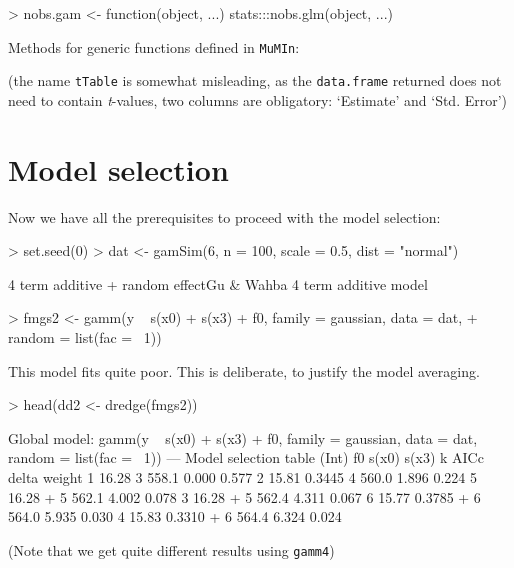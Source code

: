 \documentclass{article}
\newcommand{\code}[1]{{\tt #1}}
\newcommand{\pkg}[1]{{\tt #1}}
\newcommand{\sQuote}[1]{{`#1'}}
\begin{document}
\begin{Schunk}
\begin{Sinput}
> nobs.gam <- function(object, ...) stats:::nobs.glm(object, ...)
\end{Sinput}
\end{Schunk}

Methods for generic functions defined in \pkg{MuMIn}:
\begin{Schunk}
\end{Schunk}
(the name \code{tTable} is somewhat misleading, as the \code{data.frame}
returned does not need to contain \emph{t}-values, two columns are obligatory:
\sQuote{Estimate} and \sQuote{Std. Error})

\section{Model selection}


Now we have all the prerequisites to proceed with the model selection:


\begin{Schunk}
\begin{Sinput}
> set.seed(0)
> dat <- gamSim(6, n = 100, scale = 0.5, dist = "normal")
\end{Sinput}
\begin{Soutput}
4 term additive + random effectGu & Wahba 4 term additive model
\end{Soutput}
\begin{Sinput}
> fmgs2 <- gamm(y ~ s(x0) + s(x3) + f0, family = gaussian, data = dat, 
+     random = list(fac = ~1))
\end{Sinput}
\end{Schunk}
This model fits quite poor. This is deliberate, to justify the model averaging.

\begin{Schunk}
\begin{Sinput}
> head(dd2 <- dredge(fmgs2))
\end{Sinput}
\begin{Soutput}
Global model: gamm(y ~ s(x0) + s(x3) + f0, family = gaussian, data = dat, random = list(fac = ~1))
---
Model selection table 
  (Int) f0     s(x0) s(x3) k AICc  delta weight
1 16.28                    3 558.1 0.000 0.577 
2 15.81 0.3445             4 560.0 1.896 0.224 
5 16.28              +     5 562.1 4.002 0.078 
3 16.28        +           5 562.4 4.311 0.067 
6 15.77 0.3785       +     6 564.0 5.935 0.030 
4 15.83 0.3310 +           6 564.4 6.324 0.024 
\end{Soutput}
\end{Schunk}
(Note that we get quite different results using \code{gamm4})
\end{document}
